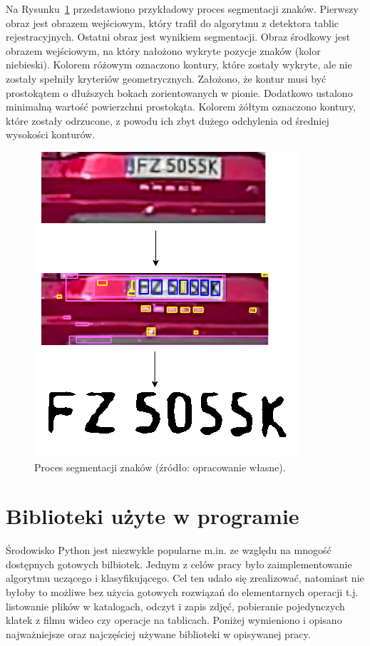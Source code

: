 \FloatBarrier
Na Rysunku~\ref{fig:segmentation} przedstawiono przykładowy proces segmentacji znaków.
Pierwszy obraz jest obrazem wejściowym, który trafił do algorytmu z detektora tablic rejestracyjnych.
Ostatni obraz jest wynikiem segmentacji.
Obraz środkowy jest obrazem wejściowym, na który nałożono wykryte pozycje znaków (kolor niebieski).
Kolorem różowym oznaczono kontury, które zostały wykryte, ale nie zostały spełniły kryteriów geometrycznych.
Założono, że kontur musi być prostokątem o dłuższych bokach zorientowanych w pionie.
Dodatkowo ustalono minimalną wartość powierzchni prostokąta.
Kolorem żółtym oznaczono kontury, które zostały odrzucone, z powodu ich zbyt dużego odchylenia od średniej wysokości konturów.
\begin{figure}[!ht]
    \centering
    \includegraphics[scale=0.4]{Pictures/segmentation}
    \caption{Proces segmentacji znaków (źródło: opracowanie własne).}
    \label{fig:segmentation}
\end{figure}
\FloatBarrier


\section{Biblioteki użyte w programie}
Środowisko Python jest niezwykle popularne m.in. ze względu na mnogość dostępnych gotowych bilbiotek.
Jednym z celów pracy było zaimplementowanie algorytmu uczącego i klasyfikującego.
Cel ten udało się zrealizować, natomiast nie byłoby to możliwe bez użycia gotowych rozwiązań do elementarnych operacji t.j. listowanie plików w katalogach, odczyt i zapis zdjęć, pobieranie pojedynczych klatek z filmu wideo czy operacje na tablicach.
Poniżej wymieniono i opisano najważniejsze oraz najczęściej używane biblioteki w opisywanej pracy.

